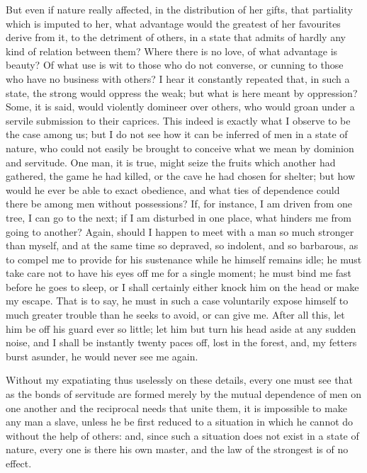 \documentclass[12pt]{report}
\begin{document}
But even if nature really affected, in the distribution of her gifts, that partiality which is imputed to her, what advantage would the greatest of her favourites derive from it, to the detriment of others, in a state that admits of hardly any kind of relation between them? Where there is no love, of what advantage is beauty? Of what use is wit to those who do not converse, or cunning to those who have no business with others? I hear it constantly repeated that, in such a state, the strong would oppress the weak; but what is here meant by oppression? Some, it is said, would violently domineer over others, who would groan under a servile submission to their caprices. This indeed is exactly what I observe to be the case among us; but I do not see how it can be inferred of men in a state of nature, who could not easily be brought to conceive what we mean by dominion and servitude. One man, it is true, might seize the fruits which another had gathered, the game he had killed, or the cave he had chosen for shelter; but how would he ever be able to exact obedience, and what ties of dependence could there be among men without possessions? If, for instance, I am driven from one tree, I can go to the next; if I am disturbed in one place, what hinders me from going to another? Again, should I happen to meet with a man so much stronger than myself, and at the same time so depraved, so indolent, and so barbarous, as to compel me to provide for his sustenance while he himself remains idle; he must take care not to have his eyes off me for a single moment; he must bind me fast before he goes to sleep, or I shall certainly either knock him on the head or make my escape. That is to say, he must in such a case voluntarily expose himself to much greater trouble than he seeks to avoid, or can give me. After all this, let him be off his guard ever so little; let him but turn his head aside at any sudden noise, and I shall be instantly twenty paces off, lost in the forest, and, my fetters burst asunder, he would never see me again.

Without my expatiating thus uselessly on these details, every one must see that as the bonds of servitude are formed merely by the mutual dependence of men on one another and the reciprocal needs that unite them, it is impossible to make any man a slave, unless he be first reduced to a situation in which he cannot do without the help of others: and, since such a situation does not exist in a state of nature, every one is there his own master, and the law of the strongest is of no effect.
\end{document}
